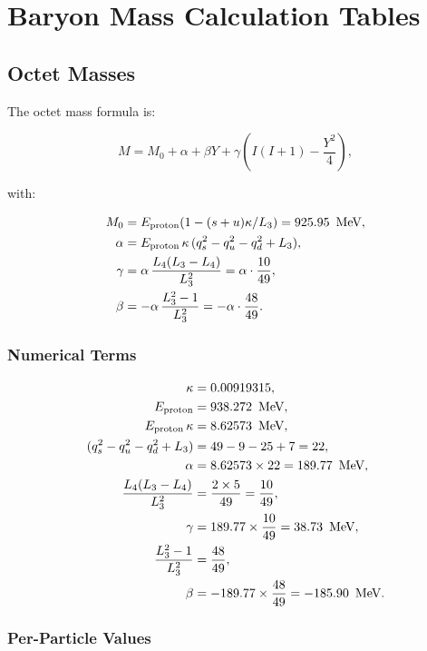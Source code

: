 \chapter{Baryon Mass Calculation Tables}
\label{app:baryon_calculations}

\section{Octet Masses}

The octet mass formula is:

\[
M = M_0 + \alpha + \beta Y + \gamma\left(I(I+1) - \frac{Y^2}{4}\right),
\]

with:

\[
\begin{aligned}
M_0    &= E_{\text{proton}}(1 - (s+u)\kappa/L_3) = 925.95\ \,\text{MeV}, \\
\alpha &= E_{\text{proton}}\,\kappa\,(q_s^2 - q_u^2 - q_d^2 + L_3), \\
\gamma &= \alpha\,\frac{L_4(L_3 - L_4)}{L_3^2}
       = \alpha \cdot \frac{10}{49}, \\
\beta  &= -\alpha\,\frac{L_3^2 - 1}{L_3^2}
       = -\alpha \cdot \frac{48}{49}.
\end{aligned}
\]

\subsection{Numerical Terms}

\[
\begin{aligned}
\kappa &= 0.00919315, \\
E_{\text{proton}} &= 938.272\ \,\text{MeV}, \\
E_{\text{proton}}\,\kappa &= 8.62573\ \,\text{MeV}, \\
(q_s^2 - q_u^2 - q_d^2 + L_3) &= 49 - 9 - 25 + 7 = 22, \\
\alpha &= 8.62573 \times 22 = 189.77\ \,\text{MeV}, \\
\frac{L_4(L_3 - L_4)}{L_3^2} &= \frac{2 \times 5}{49} = \frac{10}{49}, \\
\gamma &= 189.77 \times \frac{10}{49} = 38.73\ \,\text{MeV}, \\
\frac{L_3^2 - 1}{L_3^2} &= \frac{48}{49}, \\
\beta &= -189.77 \times \frac{48}{49} = -185.90\ \,\text{MeV}.
\end{aligned}
\]

\subsection{Per-Particle Values}

